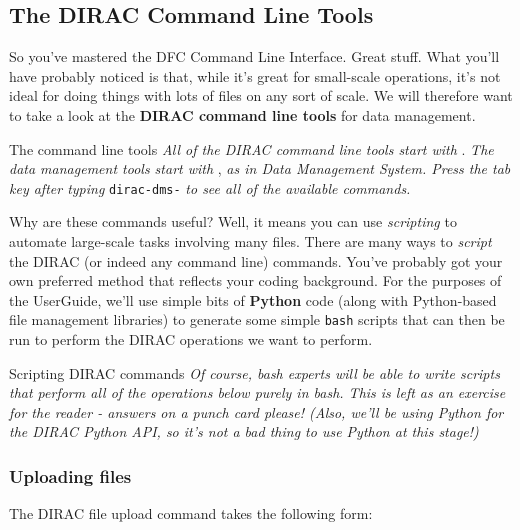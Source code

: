 \subsection{The DIRAC Command Line Tools}
\label{the-dirac-command-line-tools}
So you've mastered the DFC Command Line Interface. Great stuff. What
you'll have probably noticed is that, while it's great for small-scale
operations, it's not ideal for doing things with lots of files on any
sort of scale. We will therefore want to take a look at the
\textbf{DIRAC command line tools} for data management.

\begin{infobox}{The command line tools}
\emph{All of the DIRAC command line tools start with}
. \emph{The data management tools start with}
, \emph{as in Data Management System.
Press the tab key after typing} \texttt{dirac-dms-}
\emph{to see all of the available commands.}
\end{infobox}

Why are these commands useful? Well, it means you can use
\emph{scripting} to automate large-scale tasks involving many files.
There are many ways to \emph{script} the DIRAC (or indeed any command
line) commands. You've probably got your own preferred method that
reflects your coding background. For the purposes of the UserGuide,
we'll use simple bits of \textbf{Python} code (along with Python-based
file management libraries) to generate some simple \texttt{bash} scripts
that can then be run to perform the DIRAC operations we want to perform.

\begin{infobox}{Scripting DIRAC commands}
\emph{Of course, bash experts will be able to write scripts that perform all
of the operations below purely in bash. This is left as an exercise for
the reader - answers on a punch card please! (Also, we'll be using
Python for the DIRAC Python API, so it's not a bad thing to use Python
at this stage!)}
\end{infobox}

\subsubsection{Uploading files}
\label{uploading-files-tools}
The DIRAC file upload command takes the following form:

